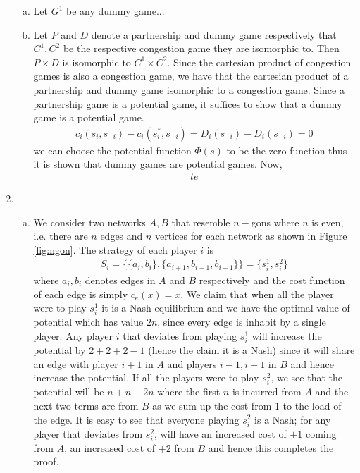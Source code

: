 \documentclass[a4paper,12pt]{article}
\theoremstyle{definition}
\begin{document}
\begin{enumerate}
\begin{enumerate}[(a)]
\item 
Let $G^1$ be any dummy game...
\item Let $P$ and $D$ denote a partnership and dummy game respectively that $C^1, C^2$ be the respective congestion game they are isomorphic to. Then $P\times D$ is isomorphic to $C^1\times C^2$. Since the cartesian product of congestion games is also a congestion game, we have that the cartesian product of a partnership and dummy game isomorphic to a congestion game. Since a partnership game is a potential game, it suffices to show that a dummy game is a potential game. 
\begin{align*}
c_i(s_i,s_{-i})-c_i(s^\ast_i,s_{-i})=D_i(s_{-i})-D_i(s_{-i})=0
\end{align*}
we can choose the potential function $\Phi(s)$ to be the zero function thus it is shown that dummy games are potential games. Now,
\begin{align*}
te
\end{align*}
\end{enumerate}


\item
\begin{enumerate}[(a)]
\item We consider two networks $A, B$ that resemble $n-$gons where $n$ is even, i.e. there are $n$ edges and $n$ vertices for each network as shown in Figure \ref{fig:ngon}. The strategy of each player $i$ is 
\begin{align*}
S_i=\{\{a_i,b_i\},\{a_{i+1},b_{i-1},b_{i+1}\}\}=\{s_i^1,s_i^2\}
\end{align*}
where $a_i,b_i$ denotes edges in $A$ and $B$ respectively and the cost function of each edge is simply $c_e(x)=x$. We claim that when all the player were to play $s_i^1$ it is a Nash equilibrium and we have the optimal value of potential which has value $2n$, since every edge is inhabit by a single player. Any player $i$ that deviates from playing $s_i^1$ will increase the potential by $2+2+2-1$ (hence the claim it is a Nash) since it will share an edge with player $i+1$ in $A$ and players $i-1, i+1$ in $B$ and hence increase the potential. If all the players were to play $s_i^2$, we see that the potential will be $n+n+2n$ where the first $n$ is incurred from $A$ and the next two terms are from $B$ as we sum up the cost from 1 to the load of the edge. It is easy to see that everyone playing $s_i^2$ is a Nash; for any player that deviates from $s_i^2$, will have an increased cost of $+1$ coming from $A$, an increased cost of $+2$ from $B$ and hence this completes the proof. 




\end{enumerate}
\end{enumerate}
\end{document}
